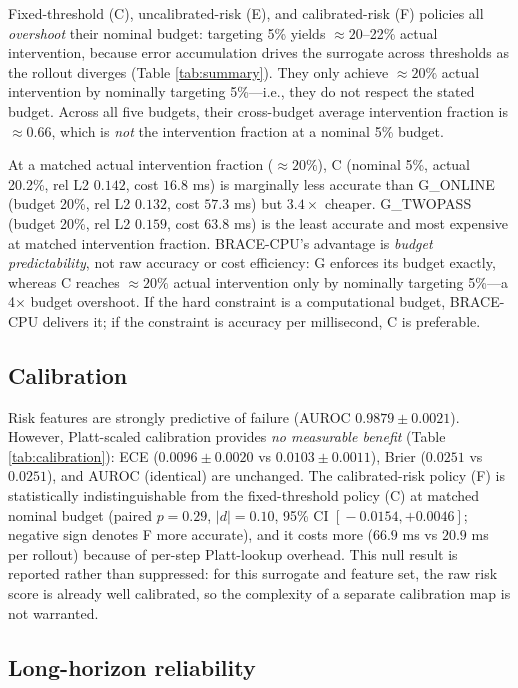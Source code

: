 \documentclass[11pt]{article}
\begin{document}
Fixed-threshold (C), uncalibrated-risk (E), and calibrated-risk (F) policies
all \emph{overshoot} their nominal budget: targeting 5\% yields $\approx 20$--22\%
actual intervention, because error accumulation drives the surrogate across
thresholds as the rollout diverges (Table \ref{tab:summary}). They only achieve
$\approx 20\%$ actual intervention by nominally targeting 5\%---i.e., they do
not respect the stated budget. Across all five budgets, their cross-budget
average intervention fraction is $\approx 0.66$, which is \emph{not} the
intervention fraction at a nominal 5\% budget.

At a matched actual intervention fraction ($\approx 20\%$), C (nominal 5\%, actual
20.2\%, rel L2 $0.142$, cost $16.8$ ms) is marginally less accurate than
G\_ONLINE (budget 20\%, rel L2 $0.132$, cost $57.3$ ms) but $3.4\times$ cheaper.
G\_TWOPASS (budget 20\%, rel L2 $0.159$, cost $63.8$ ms) is the least accurate
and most expensive at matched intervention fraction. BRACE-CPU's advantage is
\emph{budget predictability}, not raw accuracy or cost efficiency: G enforces
its budget exactly, whereas C reaches $\approx 20\%$ actual intervention only
by nominally targeting 5\%---a 4$\times$ budget overshoot. If the hard constraint
is a computational budget, BRACE-CPU delivers it; if the constraint is accuracy
per millisecond, C is preferable.

\subsection{Calibration}
\label{sec:results-calibration}

Risk features are strongly predictive of failure (AUROC $0.9879 \pm 0.0021$).
However, Platt-scaled calibration provides \emph{no measurable benefit}
(Table \ref{tab:calibration}): ECE ($0.0096 \pm 0.0020$ vs $0.0103 \pm 0.0011$),
Brier ($0.0251$ vs $0.0251$), and AUROC (identical) are unchanged. The
calibrated-risk policy (F) is statistically indistinguishable from the
fixed-threshold policy (C) at matched nominal budget (paired $p=0.29$,
$|d|=0.10$, 95\% CI $[\!-0.0154,+0.0046]$; negative sign denotes F more
accurate), and it costs more ($66.9$ ms vs $20.9$ ms per rollout) because of
per-step Platt-lookup overhead. This null result is reported rather than
suppressed: for this surrogate and feature set, the raw risk score is already
well calibrated, so the complexity of a separate calibration map is not
warranted.

\subsection{Long-horizon reliability}
\label{sec:results-reliability}
\end{document}
